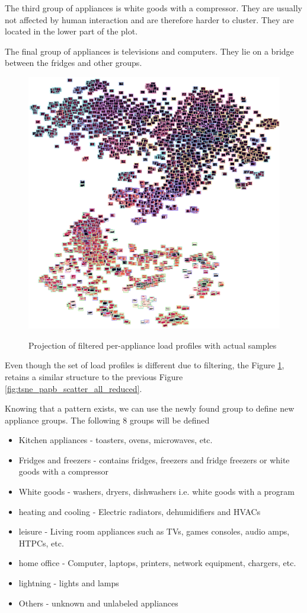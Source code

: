 The third group of appliances is white goods with a compressor.
They are usually not affected by human interaction and are therefore harder to cluster.
They are located in the lower part of the plot.

The final group of appliances is televisions and computers. They lie 
on a bridge between the fridges and other groups. 

\begin{figure}[H]
	\centering
	\caption{Projection of filtered per-appliance load profiles with actual samples}
	\includegraphics[width=.9\textwidth]{Figures/TSNE/TSNE_results/all/img_scatter_allall_reduced_max.png}
	\label{fig:tsne_papb_img_scatter_all_reduced}
\end{figure}

Even though the set of load profiles is different due to filtering,
the Figure \ref{fig:tsne_papb_img_scatter_all_reduced},
retains a similar structure to the previous Figure \ref{fig:tsne_papb_scatter_all_reduced}. 

Knowing that a pattern exists, we can use the newly found group to define new appliance groups.
The following 8 groups will be defined
\begin{itemize}
    \item Kitchen appliances - toasters, ovens, microwaves, etc.
    \item Fridges and freezers  - contains fridges, freezers and fridge freezers or white goods with a compressor
    \item White goods - washers, dryers, dishwashers i.e. white goods with a program
    \item heating and cooling - Electric radiators, dehumidifiers and HVACs
    \item leisure -  Living room appliances such as TVs, games consoles, audio amps, HTPCs, etc.
    \item home office - Computer, laptops, printers, network equipment, chargers, etc.
    \item lightning - lights and lamps
    \item Others - unknown and unlabeled appliances
\end{itemize}

